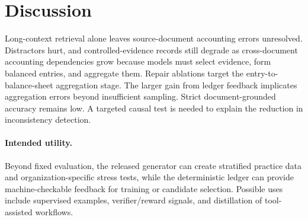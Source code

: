 \section{Discussion}
\label{sec:discussion}

Long-context retrieval alone leaves source-document accounting errors unresolved. Distractors hurt, and controlled-evidence records still degrade as cross-document accounting dependencies grow because models must select evidence, form balanced entries, and aggregate them. Repair ablations target the entry-to-balance-sheet aggregation stage. The larger gain from ledger feedback implicates aggregation errors beyond insufficient sampling. Strict document-grounded accuracy remains low. A targeted causal test is needed to explain the reduction in inconsistency detection.

\paragraph{Intended utility.}
Beyond fixed evaluation, the released generator can create stratified practice data and organization-specific stress tests, while the deterministic ledger can provide machine-checkable feedback for training or candidate selection. Possible uses include supervised examples, verifier/reward signals, and distillation of tool-assisted workflows.
